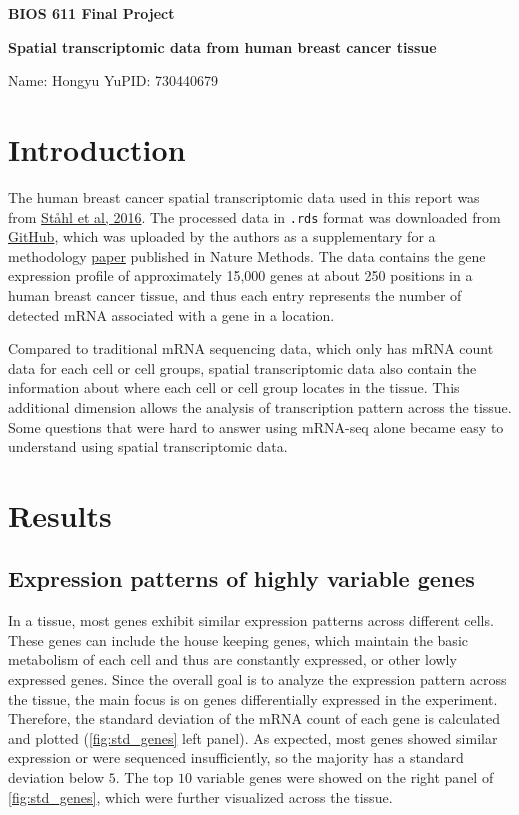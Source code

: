\documentclass[11pt,oneside]{article}
\begin{document}
{\Large\bf BIOS 611 Final Project}

\smallskip
{\large\bf Spatial transcriptomic data from human breast cancer tissue}

\smallskip
Name: Hongyu Yu\quad PID: 730440679

\section{Introduction}

The human breast cancer spatial transcriptomic data used in this report was from \href{https://www.science.org/doi/10.1126/science.aaf2403}{Ståhl et al, 2016}. The processed data in \texttt{.rds} format was downloaded from \href{https://github.com/xzhoulab/SPARK/blob/master/data/Layer2_BC_Count.rds}{GitHub}, which was uploaded by the authors as a supplementary for a methodology \href{https://www.nature.com/articles/s41592-019-0701-7}{paper} published in Nature Methods. The data contains the gene expression profile of approximately 15,000 genes at about 250 positions in a human breast cancer tissue, and thus each entry represents the number of detected mRNA associated with a gene in a location.

Compared to traditional mRNA sequencing data, which only has mRNA count data for each cell or cell groups, spatial transcriptomic data also contain the information about where each cell or cell group locates in the tissue. This additional dimension allows the analysis of transcription pattern across the tissue. Some questions that were hard to answer using mRNA-seq alone became easy to understand using spatial transcriptomic data.

\section{Results}

\subsection{Expression patterns of highly variable genes}

In a tissue, most genes exhibit similar expression patterns across different cells. These genes can include the house keeping genes, which maintain the basic metabolism of each cell and thus are constantly expressed, or other lowly expressed genes. Since the overall goal is to analyze the expression pattern across the tissue, the main focus is on genes differentially expressed in the experiment. Therefore, the standard deviation of the mRNA count of each gene is calculated and plotted (\autoref{fig:std_genes} left panel). As expected, most genes showed similar expression or were sequenced insufficiently, so the majority has a standard deviation below $5$. The top $10$ variable genes were showed on the right panel of \autoref{fig:std_genes}, which were further visualized across the tissue.
\end{document}
